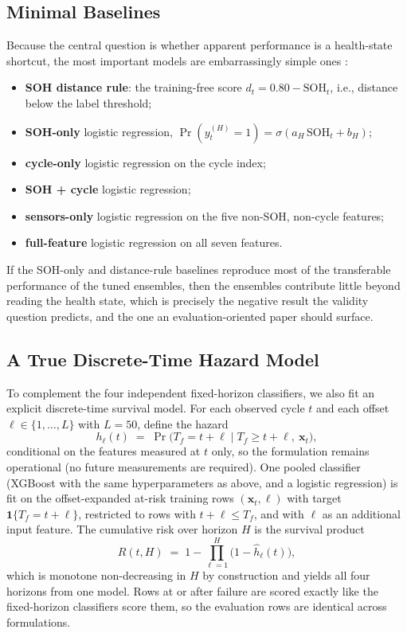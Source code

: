 \documentclass[IJPHM, 2014, 00]{PHMSociety}
\begin{document}
\subsection{Minimal Baselines}
Because the central question is whether apparent performance is a health-state shortcut, the most important models are embarrassingly simple ones \cite{shikdar2026learning}:
\begin{itemize}
\item \textbf{SOH distance rule}: the training-free score $d_t = 0.80 - \mathrm{SOH}_t$, i.e., distance below the label threshold;
\item \textbf{SOH-only} logistic regression, $\Pr(y_t^{(H)}{=}1)=\sigma(a_H\,\mathrm{SOH}_t+b_H)$;
\item \textbf{cycle-only} logistic regression on the cycle index;
\item \textbf{SOH + cycle} logistic regression;
\item \textbf{sensors-only} logistic regression on the five non-SOH, non-cycle features;
\item \textbf{full-feature} logistic regression on all seven features.
\end{itemize}
If the SOH-only and distance-rule baselines reproduce most of the transferable performance of the tuned ensembles, then the ensembles contribute little beyond reading the health state, which is precisely the negative result the validity question predicts, and the one an evaluation-oriented paper should surface.

\subsection{A True Discrete-Time Hazard Model}
To complement the four independent fixed-horizon classifiers, we also fit an explicit discrete-time survival model. For each observed cycle $t$ and each offset $\ell\in\{1,\dots,L\}$ with $L{=}50$, define the hazard
\begin{equation}\label{eq:hazard}
h_\ell(t) \;=\; \Pr\!\bigl(T_f = t{+}\ell \mid T_f \ge t{+}\ell,\ \mathbf{x}_t\bigr),
\end{equation}
conditional on the features measured at $t$ only, so the formulation remains operational (no future measurements are required). One pooled classifier (XGBoost with the same hyperparameters as above, and a logistic regression) is fit on the offset-expanded at-risk training rows $(\mathbf{x}_t, \ell)$ with target $\mathbf{1}\{T_f = t{+}\ell\}$, restricted to rows with $t{+}\ell \le T_f$, and with $\ell$ as an additional input feature. The cumulative risk over horizon $H$ is the survival product
\begin{equation}\label{eq:survival}
R(t,H) \;=\; 1 - \prod_{\ell=1}^{H}\bigl(1-\hat h_\ell(t)\bigr),
\end{equation}
which is monotone non-decreasing in $H$ by construction and yields all four horizons from one model. Rows at or after failure are scored exactly like the fixed-horizon classifiers score them, so the evaluation rows are identical across formulations.
\end{document}
